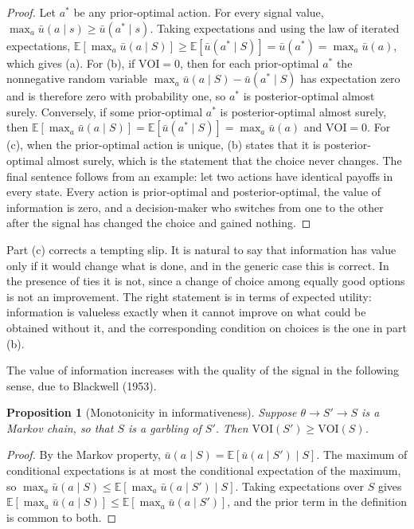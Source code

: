 \documentclass[11pt]{article}
\newtheorem{proposition}{Proposition}
\theoremstyle{remark}
\newcommand{\E}{\mathbb{E}}
\begin{document}
\begin{proof}
Let $a^\ast$ be any prior-optimal action. For every signal value, $\max_a\bar u(a\mid s)\ge\bar u(a^\ast\mid s)$. Taking expectations and using the law of iterated expectations, $\E[\max_a\bar u(a\mid S)]\ge\E[\bar u(a^\ast\mid S)]=\bar u(a^\ast)=\max_a\bar u(a)$, which gives (a). For (b), if $\mathrm{VOI}=0$, then for each prior-optimal $a^\ast$ the nonnegative random variable $\max_a\bar u(a\mid S)-\bar u(a^\ast\mid S)$ has expectation zero and is therefore zero with probability one, so $a^\ast$ is posterior-optimal almost surely. Conversely, if some prior-optimal $a^\ast$ is posterior-optimal almost surely, then $\E[\max_a\bar u(a\mid S)]=\E[\bar u(a^\ast\mid S)]=\max_a\bar u(a)$ and $\mathrm{VOI}=0$. For (c), when the prior-optimal action is unique, (b) states that it is posterior-optimal almost surely, which is the statement that the choice never changes. The final sentence follows from an example: let two actions have identical payoffs in every state. Every action is prior-optimal and posterior-optimal, the value of information is zero, and a decision-maker who switches from one to the other after the signal has changed the choice and gained nothing.
\end{proof}

Part (c) corrects a tempting slip. It is natural to say that information has value only if it would change what is done, and in the generic case this is correct. In the presence of ties it is not, since a change of choice among equally good options is not an improvement. The right statement is in terms of expected utility: information is valueless exactly when it cannot improve on what could be obtained without it, and the corresponding condition on choices is the one in part (b).

The value of information increases with the quality of the signal in the following sense, due to Blackwell (1953).

\begin{proposition}[Monotonicity in informativeness]
Suppose $\theta\to S'\to S$ is a Markov chain, so that $S$ is a garbling of $S'$. Then $\mathrm{VOI}(S')\ge\mathrm{VOI}(S)$.
\end{proposition}

\begin{proof}
By the Markov property, $\bar u(a\mid S)=\E[\bar u(a\mid S')\mid S]$. The maximum of conditional expectations is at most the conditional expectation of the maximum, so $\max_a\bar u(a\mid S)\le\E[\max_a\bar u(a\mid S')\mid S]$. Taking expectations over $S$ gives $\E[\max_a\bar u(a\mid S)]\le\E[\max_a\bar u(a\mid S')]$, and the prior term in the definition is common to both.
\end{proof}
\end{document}
